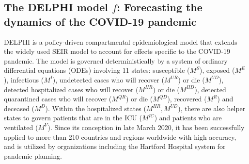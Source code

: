 \documentclass[msom,blindrev]{informs3} %
\begin{document}
\subsection{The DELPHI model $f$: Forecasting the dynamics of the COVID-19 pandemic}
\label{subsec:delphi}
DELPHI is a policy-driven compartmental epidemiological model that extends the widely used SEIR model to account for effects specific to the COVID-19 pandemic.  The model is governed deterministically by a system of ordinary differential equations (ODEs) involving 11 states: susceptible ($M^S$), exposed ($M^E$), infectious ($M^I$), undetected cases who will recover ($M^{UR}$) or die ($M^{UD}$), detected hospitalized cases who will recover ($M^{HR}$) or die ($M^{HD}$), detected quarantined cases who will recover ($M^{QR}$) or die ($M^{QD}$), recovered ($M^{R}$) and deceased ($M^{D}$). Within the hospitalized states ($M^{HR},M^{UD}$), there are also helper states to govern patients that are in the ICU ($M^{IC}$) and patients who are ventilated ($M^{V}$). Since its conception in late March 2020, it has been successfully applied to more than 210 countries and regions worldwide with high accuracy, and is utilized by organizations including the Hartford Hospital system for pandemic planning. 
\end{document}
